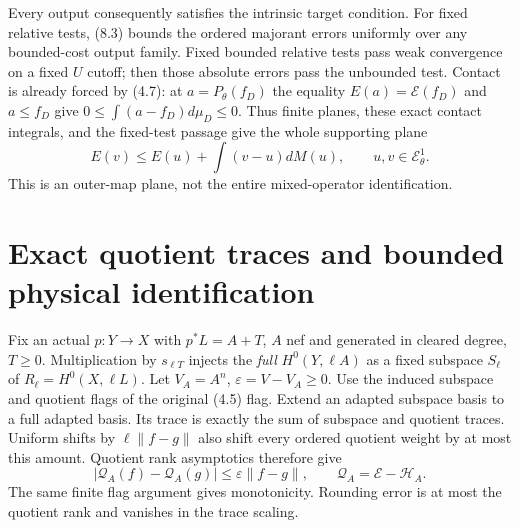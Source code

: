 \documentclass[10pt]{article}
\newcommand{\EE}{\mathcal E^1_\theta}
\begin{document}
Every output consequently satisfies the intrinsic target condition.
For fixed relative tests, (8.3) bounds the ordered majorant errors
uniformly over any bounded-cost output family. Fixed bounded relative
tests pass weak convergence on a fixed $U$ cutoff; then those absolute
errors pass the unbounded test. Contact is already forced by (4.7): at
$a=P_\theta(f_D)$ the equality $E(a)=\mathscr E(f_D)$ and $a\leq f_D$
give $0\leq\int(a-f_D)d\mu_D\leq0$. Thus finite planes, these exact
contact integrals, and the fixed-test passage give the whole supporting plane
\[
 E(v)\leq E(u)+\int(v-u)dM(u),\qquad u,v\in\EE.
 \tag{8.4}
\]
This is an outer-map plane, not the entire mixed-operator identification.

\section{Exact quotient traces and bounded physical identification}
Fix an actual $p:Y\to X$ with $p^*L=A+T$, $A$ nef and generated in
cleared degree, $T\geq0$. Multiplication by $s_{\ell T}$ injects the
\emph{full} $H^0(Y,\ell A)$ as a fixed subspace $S_\ell$ of
$R_\ell=H^0(X,\ell L)$. Let $V_A=A^n$, $\varepsilon=V-V_A\geq0$.
Use the induced subspace and quotient flags of the original (4.5) flag.
Extend an adapted subspace basis to a full adapted basis. Its trace is
exactly the sum of subspace and quotient traces. Uniform shifts by
$\ell\|f-g\|$ also shift every ordered quotient weight by at most this
amount. Quotient rank asymptotics therefore give
\[
 |\mathscr Q_A(f)-\mathscr Q_A(g)|\leq\varepsilon\|f-g\|,
 \qquad\mathscr Q_A=\mathscr E-\mathscr H_A.
 \tag{9.1}
\]
The same finite flag argument gives monotonicity. Rounding error is at
most the quotient rank and vanishes in the trace scaling.
\end{document}
